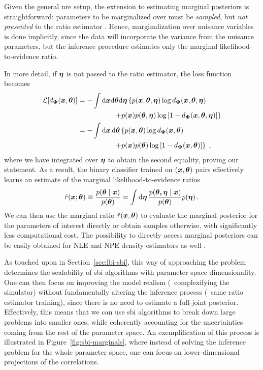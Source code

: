 Given the general \gls*{nre} setup, the extension to estimating marginal posteriors is straightforward: parameters to be marginalized over must be \emph{sampled}, but \emph{not presented} to the ratio estimator  \cite{Miller:2020hua}. Hence, marginalization over nuisance variables is done implicitly, since the data will incorporate the variance from the nuisance parameters, but the inference procedure estimates only the marginal likelihood-to-evidence ratio.

In more detail, if $\bm{\eta}$ is not passed to the ratio estimator, the loss function becomes
\begin{align} 
   \mathcal{L}[d_{\bm{\Phi}}(\bm{x}, \bm{\theta})]&= -\int \dd\bm{x} \dd\bm{\theta} \dd\bm{\eta}\left\{ p(\bm{x},\bm{\theta}, \bm{\eta}) \log d_{\bm{\Phi}}(\bm{x}, \bm{\theta},\bm{\eta}) \right. \notag \\
    &\hspace{1.8cm} \left. + p(\bm{x}) p(\bm{\theta}, \bm{\eta}) \log\left[ 1 - d_{\bm{\Phi}}(\bm{x}, \bm{\theta},\bm{\eta}) \right] \right\} \\
    &= -\int \dd{\ensuremath{\bm{x}}} \dd{\ensuremath{\bm{\theta}}} \left\{ p(\bm{x}, \bm{\theta}) \log d_{\bm{\Phi}}(\bm{x}, \bm{\theta}) \right. \notag \\
    &\hspace{1.8cm} \left. + p(\bm{x}) p(\bm{\theta}) \log\left[ 1 - d_{\bm{\Phi}}(\bm{x}, \bm{\theta}) \right] \right\} \;, \label{eq:sbi-bce-m}
\end{align}
where we have integrated over $\bm{\eta}$ to obtain the second equality, proving our statement. 
As a result, the binary classifier trained on $(\bm{x}, \bm{\theta})$ pairs effectively learns an estimate of the marginal likelihood-to-evidence ratios 
\begin{equation}\label{eq:sbi-ratio_marginal}
    \hat{r}(\bm{x};\bm{\theta}) \equiv \frac{p(\bm{\theta} \mid \bm{x})}{p(\bm{\theta})} =  \int \mathrm{d}\bm{\eta} \, \frac{p(\boldsymbol{\theta, \eta} \mid \bm{x})}{p(\bm{\theta})} p(\bm{\eta})  \, .
\end{equation}
We can then use the marginal ratio $\hat{r}(\bm{x},\bm{\theta})$ to evaluate the marginal posterior for the parameters of interest directly or obtain samples otherwise, with significantly less computational cost. The possibility to directly access marginal posteriors can be easily obtained for  NLE and NPE density estimators as well \cite{Alsing:2019xrx, Jeffrey:2020itg}.

As touched upon in Section~\ref{sec:lbi-sbi}, this way of approaching the problem determines the scalability of \gls*{sbi} algorithms with parameter space dimensionality.
One can then focus on improving the model realism (\ie~complexifying the simulator) without fundamentally altering the inference process (\ie~same ratio estimator training), since there is no need to estimate a full-joint posterior. Effectively, this means that we can use \gls*{sbi} algorithms to break down large problems into smaller ones, while coherently accounting for the uncertainties coming from the rest of the parameter space. An exemplification of this process is illustrated in Figure~\ref{fig:sbi-marginals}, where instead of solving the inference problem for the whole parameter space, one can focus on lower-dimensional projections of the correlations. 

